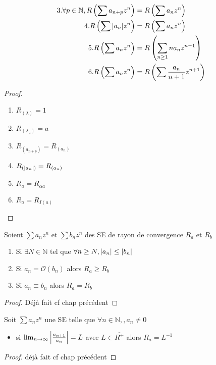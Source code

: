 \documentclass[11pt,hidelinks]{book}
\theoremstyle{mytheoremstyle}
\theoremstyle{mytheoremstyle}
\theoremstyle{mytheoremstyle}
\theoremstyle{mytheoremstyle}
\theoremstyle{mytheoremstyle}
\theoremstyle{mytheoremstyle}
\theoremstyle{mytheoremstyle}
\theoremstyle{mytheoremstyle}
\theoremstyle{myproblemstyle}
\def\mbb#1{\mathbb{#1}}
\def\mfc#1{\mathcal{#1}}
\def\bN{\mbb{N}}
\def\se{\sum a_n z^n}
\def\seb#1{\sum #1_n z^n}
\def\fn{\forall n \in \bN,}
\def\ln{\lim_{n \to \infty}}
\newcommand{\parenth}[1]{\left(#1\right)}
\begin{document}
\begin{adjustwidth}{-2em}{-1em}
\begin{prop}
\begin{align*}
            3.  \forall p \in \bN,  R\parenth{\sum a_{n+p} z^n} &= R\parenth{\se} \\ 
            4.   R\parenth{\sum \abs{a_n} z^n} &= R\parenth{\se} \\
            5.   R\parenth{\se} &= R\parenth{\sum_{n \geq 1} n a_n z^{n-1}} \\
            6.   R\parenth{\se} &= R\parenth{\sum \frac{a_n}{n+1} z^{n+1}}
        \end{align*}
        \begin{proof}
            \begin{enumerate}
            \item $R_{(\lambda)} = 1$  
            \item $R_{(\lambda_a)} = a$  
            \item $R_{(a_{n+p})} = R_{(a_n)}$ 
            \item $R_{(\abs{a_n})} = R_{(a_n)}$  
            \item $R_a = R_{\alpha a}$ 
            \item $R_a = R_{I(a)}$
            \end{enumerate}
        \end{proof}
    \end{prop}
    \begin{prop}
        Soient $\se$ et $\seb{b}$ des SE de rayon de convergence $R_a$ et $R_b$
        \begin{enumerate} 
        \item Si $\exists N \in \bN$ tel que $\forall n\geq N, \abs{a_n} \leq \abs{b_n}$  
        \item Si $a_n = \mfc{O}(b_n)$ alors $R_a \geq R_b$  
        \item Si $a_n \equiv b_n$ alors $R_a = R_b$
        \end{enumerate}
        \begin{proof}
            Déjà fait cf chap précédent
        \end{proof}
    \end{prop}
    \begin{prop}
        Soit $\se$ une SE telle que $\fn, a_n \not= 0$ 
        \begin{itemize}[label=$\circ$]
        \item si $\ln \abs{\frac{a_{n+1}}{a_n}} = L$ avec $L \in \overline{R^+}$ alors $R_a = L^{-1}$
        \end{itemize}
        \begin{proof}
            déjà fait cf chap précédent

\end{proof}
\end{prop}
\end{adjustwidth}
\end{document}
